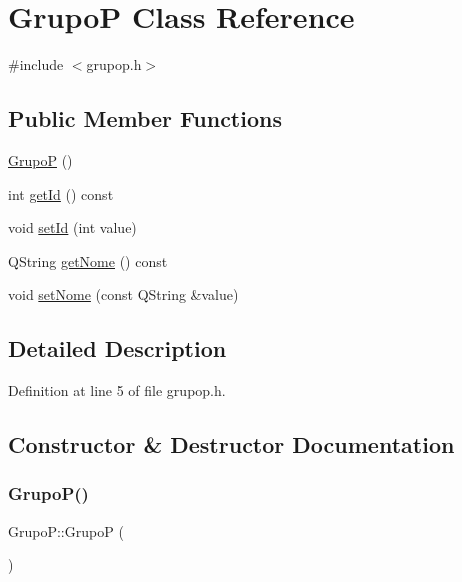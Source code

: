 \hypertarget{class_grupo_p}{}\section{GrupoP Class Reference}
\label{class_grupo_p}


{\ttfamily \#include $<$grupop.\+h$>$}

\subsection*{Public Member Functions}
\begin{DoxyCompactItemize}
\item 
\hyperlink{class_grupo_p_aac812d0b4a0c443b7d7e36c00f60d23e}{GrupoP} ()
\item 
int \hyperlink{class_grupo_p_a3c72988138413046461c510b97ef7605}{get\+Id} () const
\item 
void \hyperlink{class_grupo_p_a540f8d78b7468b26b647485cc72fd7ca}{set\+Id} (int value)
\item 
Q\+String \hyperlink{class_grupo_p_ac3b0a8d64e082b45a7d362c69d934cd7}{get\+Nome} () const
\item 
void \hyperlink{class_grupo_p_af747750583e09cf0a1cfe756bacf97bc}{set\+Nome} (const Q\+String \&value)
\end{DoxyCompactItemize}


\subsection{Detailed Description}


Definition at line 5 of file grupop.\+h.



\subsection{Constructor \& Destructor Documentation}
\hypertarget{class_grupo_p_aac812d0b4a0c443b7d7e36c00f60d23e}{}\label{class_grupo_p_aac812d0b4a0c443b7d7e36c00f60d23e} 
\subsubsection{\texorpdfstring{Grupo\+P()}{GrupoP()}}
{\footnotesize\ttfamily Grupo\+P\+::\+GrupoP (\begin{DoxyParamCaption}{ }\end{DoxyParamCaption})}



